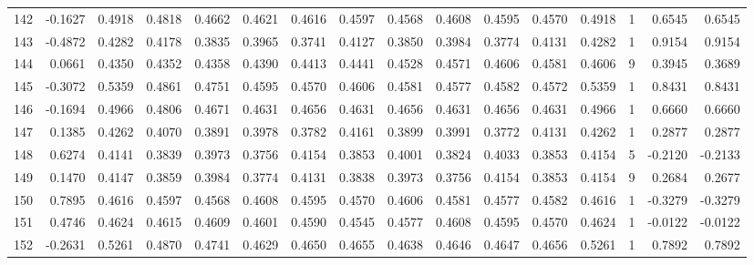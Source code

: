 \begin{tabular}{lrrrrrrrrrrrrrrr}
142 &     -0.1627 &  0.4918 &  0.4818 &  0.4662 &  0.4621 &  0.4616 &  0.4597 &  0.4568 &  0.4608 &  0.4595 &   0.4570 &     0.4918 &      1 &                    0.6545 &                     0.6545 \\
143 &     -0.4872 &  0.4282 &  0.4178 &  0.3835 &  0.3965 &  0.3741 &  0.4127 &  0.3850 &  0.3984 &  0.3774 &   0.4131 &     0.4282 &      1 &                    0.9154 &                     0.9154 \\
144 &      0.0661 &  0.4350 &  0.4352 &  0.4358 &  0.4390 &  0.4413 &  0.4441 &  0.4528 &  0.4571 &  0.4606 &   0.4581 &     0.4606 &      9 &                    0.3945 &                     0.3689 \\
145 &     -0.3072 &  0.5359 &  0.4861 &  0.4751 &  0.4595 &  0.4570 &  0.4606 &  0.4581 &  0.4577 &  0.4582 &   0.4572 &     0.5359 &      1 &                    0.8431 &                     0.8431 \\
146 &     -0.1694 &  0.4966 &  0.4806 &  0.4671 &  0.4631 &  0.4656 &  0.4631 &  0.4656 &  0.4631 &  0.4656 &   0.4631 &     0.4966 &      1 &                    0.6660 &                     0.6660 \\
147 &      0.1385 &  0.4262 &  0.4070 &  0.3891 &  0.3978 &  0.3782 &  0.4161 &  0.3899 &  0.3991 &  0.3772 &   0.4131 &     0.4262 &      1 &                    0.2877 &                     0.2877 \\
148 &      0.6274 &  0.4141 &  0.3839 &  0.3973 &  0.3756 &  0.4154 &  0.3853 &  0.4001 &  0.3824 &  0.4033 &   0.3853 &     0.4154 &      5 &                   -0.2120 &                    -0.2133 \\
149 &      0.1470 &  0.4147 &  0.3859 &  0.3984 &  0.3774 &  0.4131 &  0.3838 &  0.3973 &  0.3756 &  0.4154 &   0.3853 &     0.4154 &      9 &                    0.2684 &                     0.2677 \\
150 &      0.7895 &  0.4616 &  0.4597 &  0.4568 &  0.4608 &  0.4595 &  0.4570 &  0.4606 &  0.4581 &  0.4577 &   0.4582 &     0.4616 &      1 &                   -0.3279 &                    -0.3279 \\
151 &      0.4746 &  0.4624 &  0.4615 &  0.4609 &  0.4601 &  0.4590 &  0.4545 &  0.4577 &  0.4608 &  0.4595 &   0.4570 &     0.4624 &      1 &                   -0.0122 &                    -0.0122 \\
152 &     -0.2631 &  0.5261 &  0.4870 &  0.4741 &  0.4629 &  0.4650 &  0.4655 &  0.4638 &  0.4646 &  0.4647 &   0.4656 &     0.5261 &      1 &                    0.7892 &                     0.7892 \\

\end{tabular}
